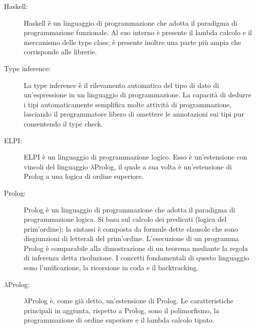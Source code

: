 \documentclass[12pt,a4paper,openright,twoside]{report}
\begin{document}
\begin{description}
 \item[Haskell:] Haskell è un linguaggio di programmazione che adotta il paradigma di programmazione funzionale. Al suo interno è presente il lambda calcolo e il meccanismo delle type class; è presente inoltre una parte più ampia che corrisponde alle librerie.\\
 \item[Type inference:] La type inference è il rilevamento automatico del tipo di dato di un'espressione in un linguaggio di programmazione. La capacità di dedurre i tipi automaticamente semplifica molte attività di programmazione, lasciando il programmatore libero di omettere le annotazioni sui tipi pur consentendo il type check.\\
 \item[ELPI:] ELPI è un linguaggio di programmazione logico. Esso è un'estensione con vincoli del linguaggio $\lambda$Prolog, il quale a sua volta è un'estensione di Prolog a una logica di ordine superiore.\\
 \item[Prolog:] Prolog è un linguaggio di programmazione che adotta il paradigma di programmazione logica. Si basa sul calcolo dei predicati (logica del prim'ordine); la sintassi è composta da formule dette clausole che sono disgiunzioni di letterali del prim'ordine. L'esecuzione di un programma Prolog è comparabile alla dimostrazione di un teorema mediante la regola di inferenza detta risoluzione. I concetti fondamentali di questo linguaggio sono l'unificazione, la ricorsione in coda e il backtracking.\\
 \item[$\lambda$Prolog:] $\lambda$Prolog è, come già detto, un'estensione di Prolog. Le caratteristiche principali in aggiunta, rispetto a Prolog, sono il polimorfismo, la programmazione di ordine superiore e il lambda calcolo tipato.\\
\end{description}
\end{document}
